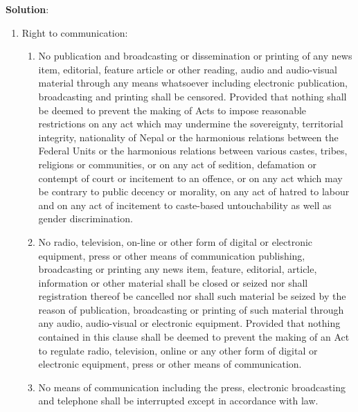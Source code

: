\documentclass[
  openany]{book}
\newenvironment{solution}{ {\bfseries Solution}:}{}
\begin{document}
\begin{questions}
\begin{solution}
\begin{enumerate}
\item Right to communication:
\begin{enumerate}
\item No publication and broadcasting or dissemination or printing of any news item, editorial, feature article or other reading, audio and audio-visual material through any means whatsoever including electronic publication, broadcasting and printing shall be censored. Provided that nothing shall be deemed to prevent the making of Acts to impose reasonable restrictions on any act which may undermine the sovereignty, territorial integrity, nationality of Nepal or the harmonious relations between the Federal Units or the harmonious relations between various castes, tribes, religions or communities, or on any act of sedition, defamation or contempt of court or incitement to an offence, or on any act which may be contrary to public decency or morality, on any act of hatred to labour and on any act of incitement to caste-based untouchability as well as gender discrimination.
\item No radio, television, on-line or other form of digital or electronic equipment, press or other means of communication publishing, broadcasting or printing any news item, feature, editorial, article, information or other material shall be closed or seized nor shall registration thereof be cancelled nor shall such material be seized by the reason of publication, broadcasting or printing of such material through any audio, audio-visual or electronic equipment. Provided that nothing contained in this clause shall be deemed to prevent the making of an Act to regulate radio, television, online or any other form of digital or electronic equipment, press or other means of communication.
\item No means of communication including the press, electronic broadcasting and telephone shall be interrupted except in accordance with law.
\end{enumerate}


\end{enumerate}
\end{solution}
\end{questions}
\end{document}
